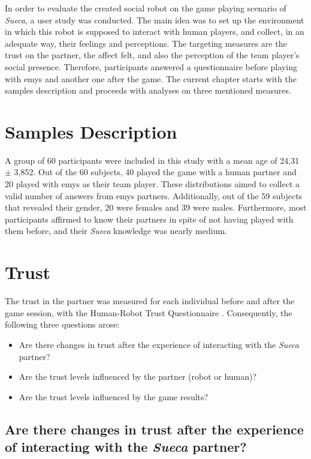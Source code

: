 \label{chapter:results}

In order to evaluate the created social robot on the game playing scenario of \emph{Sueca}, a user study was conducted.
The main idea was to set up the environment in which this robot is supposed to interact with human players, and collect, in an adequate way, their feelings and perceptions.
The targeting measures are the trust on the partner, the affect felt, and also the perception of the team player's social presence.
Therefore, participants answered a questionnaire before playing with \ac{emys} and another one after the game.
The current chapter starts with the samples description and proceeds with analyses on three mentioned measures.

\section{Samples Description}
\label{sec:samples}
A group of 60 participants were included in this study with a mean age of 24,31 $\pm$ 3,852.
Out of the 60 subjects, 40 played the game with a human partner and 20 played with \ac{emys} as their team player.
These distributions aimed to collect a valid number of answers from \ac{emys} partners.
Additionally, out of the 59 subjects that revealed their gender, 20 were females and 39 were males.
Furthermore, most participants affirmed to know their partners in spite of not having played with them before, and their \emph{Sueca} knowledge was nearly medium.

\section{Trust}
\label{sec:trust}
The trust in the partner was measured for each individual before and after the game session, with the Human-Robot Trust Questionnaire \cite{}.
Consequently, the following three questions arose:
\begin{itemize}
\item Are there changes in trust after the experience of interacting with the \emph{Sueca} partner?
\item Are the trust levels influenced by the partner (robot or human)?
\item Are the trust levels influenced by the game results?
\end{itemize}

\subsection*{Are there changes in trust after the experience of interacting with the \emph{Sueca} partner?}

